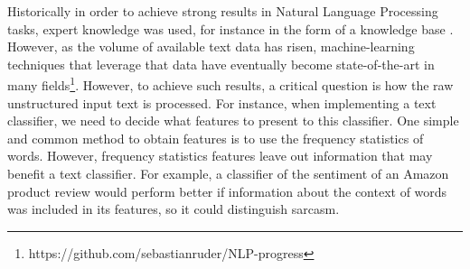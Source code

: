 Historically in order to achieve strong results in Natural Language Processing tasks, expert knowledge was used, for instance in the form of a knowledge base \cite{Lewis1993}. However, as the volume of available text data has risen,  machine-learning techniques that leverage that data have eventually  become state-of-the-art in many fields\footnote{https://github.com/sebastianruder/NLP-progress}. However, to achieve such results, a critical question is how the raw unstructured input text is processed. For instance, when implementing a text classifier, we need to decide what features to present to this classifier. One simple and common method to obtain features is to use the  frequency statistics of words. However, frequency statistics features  leave out information that may benefit a text classifier. For example, a classifier of the sentiment of an Amazon product review would perform better if  information about the context of words was included in its features, so it could distinguish sarcasm.  %





